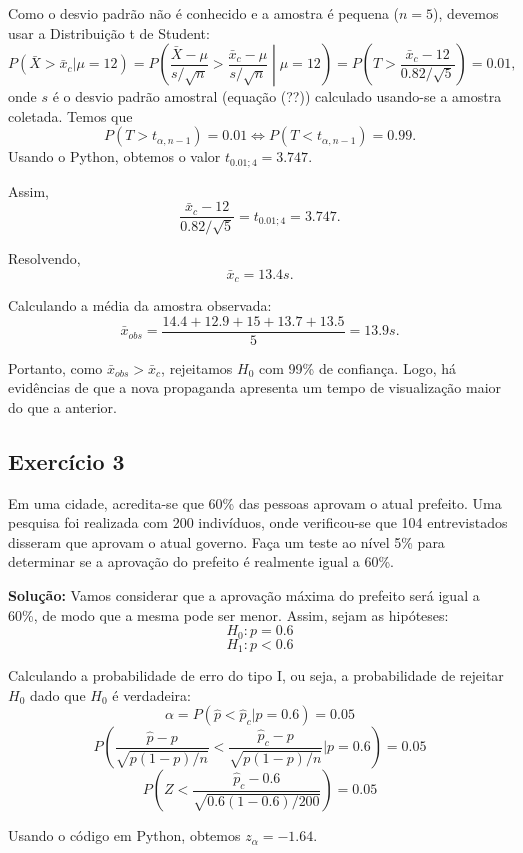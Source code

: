 \documentclass{article}
\begin{document}
Como o desvio padrão não é conhecido e a amostra é pequena ($n=5$), devemos usar a Distribuição t de Student:
    $$
    P(\bar{X} > \bar{x}_c | \mu = 12) 
    = P\left( \frac{\bar{X} - \mu}{s/\sqrt{n}} > \frac{\bar{x}_c - \mu}{s/\sqrt{n}} \middle| \mu = 12 \right) 
    = P\left(T > \frac{\bar{x}_c - 12}{0.82/\sqrt{5}}\right) = 0.01,
    $$
onde $s$ é o desvio padrão amostral (equação (??)) calculado usando-se a amostra coletada. Temos que 
    $$
    P(T > t_{\alpha, n-1}) = 0.01 \Leftrightarrow P(T < t_{\alpha, n-1}) = 0.99.
    $$
Usando o Python, obtemos o valor $t_{0.01;4} = 3.747$.

Assim,
    $$
    \frac{\bar{x}_c - 12}{0.82/\sqrt{5}} = t_{0.01;4} = 3.747.
    $$

Resolvendo,
    $$
    \bar{x}_c = 13.4s.
    $$

Calculando a média da amostra observada:
    $$
    \bar{x}_{obs} = \frac{14.4 + 12.9 + 15 + 13.7 + 13.5}{5} = 13.9s.
    $$

Portanto, como $\bar{x}_{obs} > \bar{x}_c$, rejeitamos $H_0$ com 99\% de confiança. Logo, há evidências de que a nova propaganda apresenta um tempo de visualização maior do que a anterior.

\subsection{Exercício 3}
Em uma cidade, acredita-se que 60\% das pessoas aprovam o atual prefeito. Uma pesquisa foi realizada com 200 indivíduos, onde verificou-se que 104 entrevistados disseram que aprovam o atual governo. Faça um teste ao nível 5\% para determinar se a aprovação do prefeito é realmente igual a 60\%.

\vspace{0.5cm}
\textbf{Solução:}
Vamos considerar que a aprovação máxima do prefeito será igual a 60\%, de modo que a mesma pode ser menor. Assim, sejam as hipóteses:
    $$
    H_0 : p = 0.6
    $$
    $$
    H_1 : p < 0.6
    $$

Calculando a probabilidade de erro do tipo I, ou seja, a probabilidade de rejeitar $H_0$ dado que $H_0$ é verdadeira:
    $$
    \alpha = P(\hat{p} < \hat{p}_c | p = 0.6) = 0.05
    $$
    $$
    P\left( 
    \frac{\hat{p} - p}{\sqrt{p(1-p)/n}} 
    <
    \frac{\hat{p}_c - p}{\sqrt{p(1-p)/n}} 
    \bigg| p = 0.6 
    \right) = 0.05
    $$
    $$
    P\left(
    Z <
    \frac{\hat{p}_c - 0.6}{\sqrt{0.6(1-0.6)/200}}
    \right) = 0.05
    $$

Usando o código em Python, obtemos $z_\alpha = -1.64$.
\end{document}
